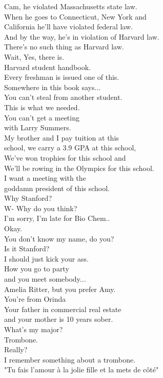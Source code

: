 \documentclass{article}
\begin{document}
\begin{multicols}{3}
Cam, he violated Massachusetts state law.\\
When he goes to Connecticut, New York and\\
California he'll have violated federal law.\\
And by the way, he's in violation of Harvard law.\\
There's no such thing as Harvard law.\\
Wait, Yes, there is.\\
Harvard student handbook.\\
Every freshman is issued one of this.\\
Somewhere in this book says...\\
You can't steal from another student.\\
This is what we needed.\\
You can't get a meeting\\
with Larry Summers.\\
My brother and I pay tuition at this\\
school, we carry a 3.9 GPA at this school,\\
We've won trophies for this school and\\
We'll be rowing in the Olympics for this school.\\
I want a meeting with the\\
goddamn president of this school.\\
Why Stanford?\\
W- Why do you think?\\
I'm sorry, I'm late for Bio Chem..\\
Okay.\\
You don't know my name, do you?\\
Is it Stanford?\\
I should just kick your ass.\\
How you go to party\\
and you meet somebody...\\
Amelia Ritter, but you prefer Amy.\\
You're from Orinda\\
Your father in commercial real estate\\
and your mother is 10 years sober.\\
What's my major?\\
Trombone.\\
Really?\\
I remember something about a trombone.\\
"Tu fais l'amour à la jolie fille et la mets de côté"\\

\end{multicols}
\end{document}
